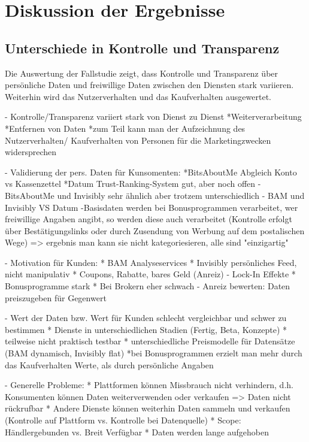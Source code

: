 \section{Diskussion der Ergebnisse}

\subsection{Unterschiede in Kontrolle und Transparenz}
Die Auswertung der Fallstudie zeigt, dass Kontrolle und Transparenz über persönliche Daten und freiwillige Daten zwischen den Diensten stark variieren. Weiterhin wird das Nutzerverhalten und das Kaufverhalten ausgewertet.

- Kontrolle/Transparenz variiert stark von Dienst zu Dienst
    *Weiterverarbeitung
    *Entfernen von Daten
    *zum Teil kann man der Aufzeichnung des Nutzerverhalten/ Kaufverhalten von Personen für die Marketingzwecken widersprechen

- Validierung der pers. Daten für Kunsomenten: 
    *BitsAboutMe Abgleich Konto vs Kassenzettel
    *Datum Trust-Ranking-System gut, aber noch offen
- BitsAboutMe und Invisibly sehr ähnlich aber trotzem unterschiedlich
- BAM und Invisibly VS Datum
-Basisdaten werden bei Bonusprogrammen verarbeitet, wer freiwillige Angaben angibt, so werden diese auch verarbeitet (Kontrolle erfolgt über Bestätigungslinks oder durch Zusendung von Werbung auf dem postalischen Wege)
=> ergebnis man kann sie nicht kategoriesieren, alle sind "einzigartig"


- Motivation für Kunden:
    * BAM Analyseservices
    * Invisibly persönliches Feed, nicht manipulativ
    * Coupons, Rabatte, bares Geld (Anreiz)
- Lock-In Effekte
    * Bonusprogramme stark
    * Bei Brokern eher schwach
- Anreiz bewerten: Daten preiszugeben für Gegenwert

- Wert der Daten bzw. Wert für Kunden schlecht vergleichbar und schwer zu bestimmen
    * Dienste in unterschiedlichen Stadien (Fertig, Beta, Konzepte)
    * teilweise nicht praktisch testbar
    * unterschiedliche Preismodelle für Datensätze (BAM dynamisch, Invisibly flat)
    *bei Bonusprogrammen erzielt man mehr durch das Kaufverhalten Werte, als durch persönliche Angaben

- Generelle Probleme:
    * Plattformen können Missbrauch nicht verhindern, d.h. Konsumenten können Daten weiterverwenden oder verkaufen => Daten nicht rückrufbar
    * Andere Dienste können weiterhin Daten sammeln und verkaufen (Kontrolle auf Plattform vs. Kontrolle bei Datenquelle)
    * Scope: Händlergebunden vs. Breit Verfügbar
    * Daten werden lange aufgehoben

